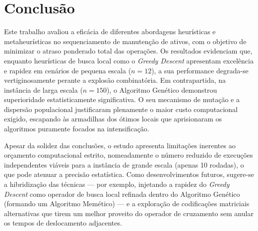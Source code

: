 \section{Conclusão}
\label{sec:conclusao}

Este trabalho avaliou a eficácia de diferentes abordagens heurísticas e metaheurísticas no sequenciamento de manutenção de ativos, com o objetivo de minimizar o atraso ponderado total das operações. Os resultados evidenciam que, enquanto heurísticas de busca local como o \textit{Greedy Descent} apresentam excelência e rapidez em cenários de pequena escala ($n=12$), a sua performance degrada-se vertiginosamente perante a explosão combinatória. Em contrapartida, na instância de larga escala ($n=150$), o Algoritmo Genético demonstrou superioridade estatisticamente significativa. O seu mecanismo de mutação e a dispersão populacional justificaram plenamente o maior custo computacional exigido, escapando às armadilhas dos ótimos locais que aprisionaram os algoritmos puramente focados na intensificação.

Apesar da solidez das conclusões, o estudo apresenta limitações inerentes ao orçamento computacional estrito, nomeadamente o número reduzido de execuções independentes viáveis para a instância de grande escala (apenas 10 rodadas), o que pode atenuar a precisão estatística. Como desenvolvimentos futuros, sugere-se a hibridização das técnicas --- por exemplo, injetando a rapidez do \textit{Greedy Descent} como operador de busca local refinada dentro do Algoritmo Genético (formando um Algoritmo Memético) --- e a exploração de codificações matriciais alternativas que tirem um melhor proveito do operador de cruzamento sem anular os tempos de deslocamento adjacentes.